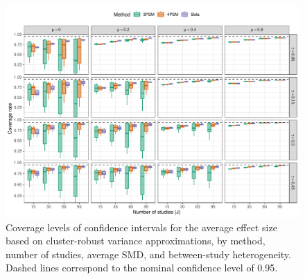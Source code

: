 \documentclass[
]{article}
\begin{document}
\begin{figure}
\includegraphics{appendix-simulation-results_files/figure-latex/comparison-coverage-full-miss-1} \caption{Coverage levels of confidence intervals for the average effect size based on cluster-robust variance approximations, by method, number of studies, average SMD, and between-study heterogeneity. Dashed lines correspond to the nominal confidence level of 0.95.}\label{fig:comparison-coverage-full-miss}
\end{figure}
\end{document}
